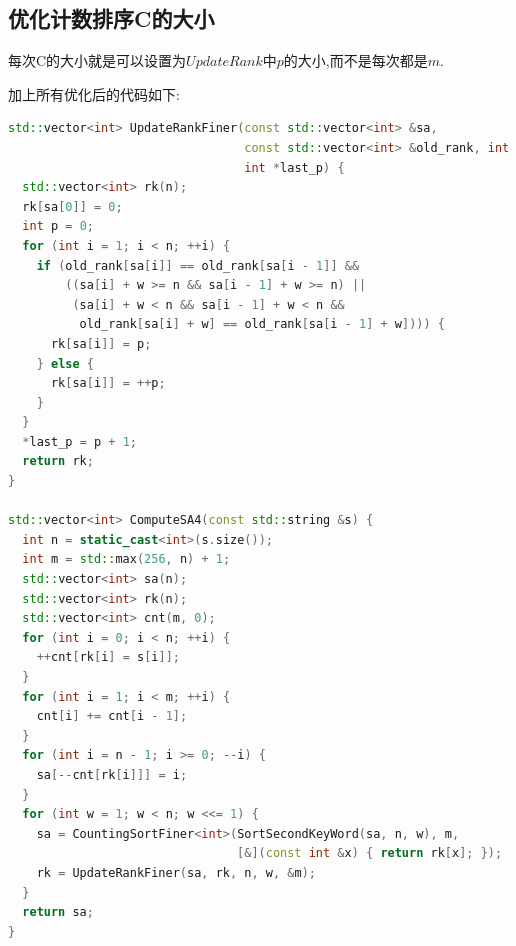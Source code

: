 \documentclass{article}
\begin{document}
\subsection{优化计数排序C的大小}
每次C的大小就是可以设置为$UpdateRank$中$p$的大小,而不是每次都是$m$. \par
加上所有优化后的代码如下: \par
\begin{lstlisting}[language=C++, caption={Best}]
std::vector<int> UpdateRankFiner(const std::vector<int> &sa,
                                 const std::vector<int> &old_rank, int n, int w,
                                 int *last_p) {
  std::vector<int> rk(n);
  rk[sa[0]] = 0;
  int p = 0;
  for (int i = 1; i < n; ++i) {
    if (old_rank[sa[i]] == old_rank[sa[i - 1]] &&
        ((sa[i] + w >= n && sa[i - 1] + w >= n) ||
         (sa[i] + w < n && sa[i - 1] + w < n &&
          old_rank[sa[i] + w] == old_rank[sa[i - 1] + w]))) {
      rk[sa[i]] = p;
    } else {
      rk[sa[i]] = ++p;
    }
  }
  *last_p = p + 1;
  return rk;
}

std::vector<int> ComputeSA4(const std::string &s) {
  int n = static_cast<int>(s.size());
  int m = std::max(256, n) + 1;
  std::vector<int> sa(n);
  std::vector<int> rk(n);
  std::vector<int> cnt(m, 0);
  for (int i = 0; i < n; ++i) {
    ++cnt[rk[i] = s[i]];
  }
  for (int i = 1; i < m; ++i) {
    cnt[i] += cnt[i - 1];
  }
  for (int i = n - 1; i >= 0; --i) {
    sa[--cnt[rk[i]]] = i;
  }
  for (int w = 1; w < n; w <<= 1) {
    sa = CountingSortFiner<int>(SortSecondKeyWord(sa, n, w), m,
                                [&](const int &x) { return rk[x]; });
    rk = UpdateRankFiner(sa, rk, n, w, &m);
  }
  return sa;
}
\end{lstlisting}
\end{document}
